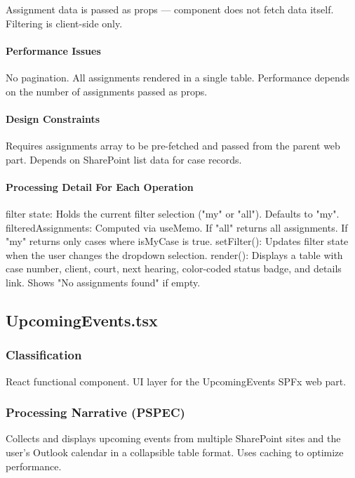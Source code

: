 \documentclass[12pt]{article}
\begin{document}
Assignment data is passed as props --- component does not fetch data itself. Filtering is client-side only.

\paragraph{Performance Issues}

No pagination. All assignments rendered in a single table. Performance depends on the number of assignments passed as props.

\paragraph{Design Constraints}

Requires assignments array to be pre-fetched and passed from the parent web part. Depends on SharePoint list data for case records.

\paragraph{Processing Detail For Each Operation}

filter state: Holds the current filter selection ("my" or "all"). Defaults to "my". filteredAssignments: Computed via useMemo. If "all" returns all assignments. If "my" returns only cases where isMyCase is true. setFilter(): Updates filter state when the user changes the dropdown selection. render(): Displays a table with case number, client, court, next hearing, color-coded status badge, and details link. Shows "No assignments found" if empty.

\subsection{UpcomingEvents.tsx}

\subsubsection{Classification}

React functional component. UI layer for the UpcomingEvents SPFx web part.

\subsubsection{Processing Narrative (PSPEC)}

Collects and displays upcoming events from multiple SharePoint sites and the user's Outlook calendar in a collapsible table format. Uses caching to optimize performance.
\end{document}
